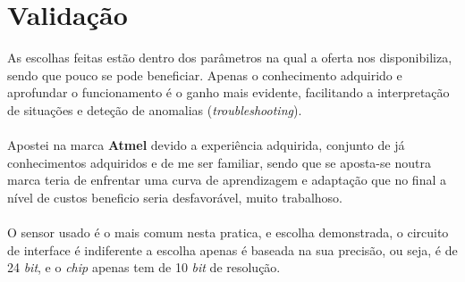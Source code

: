 \section{Validação}
As escolhas feitas estão dentro dos parâmetros na qual a oferta nos disponibiliza, sendo que pouco se pode beneficiar. Apenas o conhecimento adquirido e aprofundar o funcionamento é o ganho mais evidente, facilitando a interpretação de situações e deteção de anomalias (\textit{troubleshooting}).\\
\\
Apostei na marca \textbf{Atmel} devido a experiência adquirida, conjunto de já conhecimentos adquiridos e de me ser familiar, sendo que se aposta-se noutra marca teria de enfrentar uma curva de aprendizagem e adaptação que no final a nível de custos beneficio seria desfavorável, muito trabalhoso.\\
\\
O sensor usado é o mais comum nesta pratica, e escolha demonstrada, o circuito de interface é indiferente a escolha apenas é baseada na sua precisão, ou seja, é de 24 \textit{bit}, e o \textit{chip} apenas tem  de 10 \textit{bit} de resolução.

